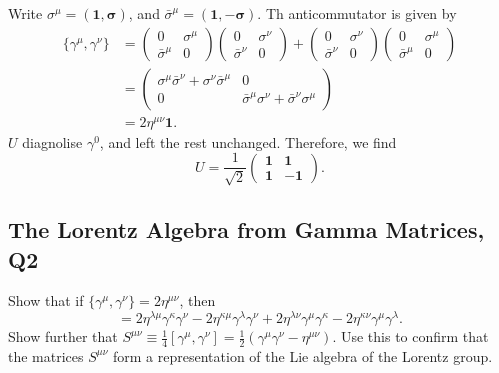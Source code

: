 \begin{solution}
    Write $\sigma^\mu = (\mathbf{1},\mathbf{\sigma})$, and $\bar{\sigma}^\mu = (\mathbf{1},-\mathbf{\sigma})$. Th anticommutator is given by 
    \begin{equation}
    \begin{aligned}
        \{\gamma^\mu,\gamma^\nu\} &= \begin{pmatrix}
            0&\sigma^\mu\\
            \bar{\sigma}^\mu &0
        \end{pmatrix}\begin{pmatrix}
            0&\sigma^\nu\\
            \bar{\sigma}^\nu &0
        \end{pmatrix}+\begin{pmatrix}
            0&\sigma^\nu\\
            \bar{\sigma}^\nu &0
        \end{pmatrix}\begin{pmatrix}
            0&\sigma^\mu\\
            \bar{\sigma}^\mu &0
        \end{pmatrix}\\
        &=\begin{pmatrix}
            \sigma^\mu\bar{\sigma}^\nu + \sigma^\nu\bar{\sigma}^\mu&0\\
            0&\bar{\sigma}^\mu\sigma^\nu + \bar{\sigma}^\nu\sigma^\mu
        \end{pmatrix}
        \\&=2\eta^{\mu\nu}\mathbf{1}.
    \end{aligned}
    \end{equation}
    $U$ diagnolise $\gamma^0$, and left the rest unchanged. Therefore, we find
    \begin{equation}
        U = \frac{1}{\sqrt{2}}\begin{pmatrix}
            \mathbf{1}&\mathbf{1}\\
            \mathbf{1}&-\mathbf{1}
        \end{pmatrix}.
    \end{equation}
\end{solution}

\subsection{The Lorentz Algebra from Gamma Matrices, Q2}

Show that if $\{\gamma^\mu, \gamma^\nu\} = 2\eta^{\mu\nu}$, then
\begin{equation}
    [\gamma^\kappa\gamma^\lambda, \gamma^\mu\gamma^\nu] = 2\eta^{\lambda\mu}\gamma^\kappa\gamma^\nu - 2\eta^{\kappa\mu}\gamma^\lambda\gamma^\nu + 2\eta^{\lambda\nu}\gamma^\mu\gamma^\kappa - 2\eta^{\kappa\nu}\gamma^\mu\gamma^\lambda.
\end{equation}
Show further that $S^{\mu\nu} \equiv \frac{1}{4}[\gamma^\mu, \gamma^\nu] = \frac{1}{2}(\gamma^\mu\gamma^\nu - \eta^{\mu\nu})$. Use this to confirm that the matrices $S^{\mu\nu}$ form a representation of the Lie algebra of the Lorentz group.

